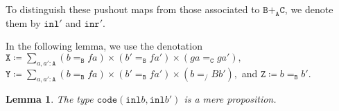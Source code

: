 \message{ !name(notes.tex)}\documentclass[12pt]{amsart}
\newcommand{\bydef}{\coloneqq}
\newcommand{\type}[1]{\mathtt{#1}}
\newcommand{\A}{\type{A}}
\newcommand{\B}{\type{B}}
\newcommand{\C}{\type{C}}
\newcommand{\BAC}{\B +_{\A} \C}
\newcommand{\inl}{\type{inl}}
\newcommand{\inr}{\type{inr}}
\newcommand{\code}{\type{code}}
\newtheorem{lemma}{Lemma}
\theoremstyle{remark}
\theoremstyle{definition}
\begin{document}
To distinguish these pushout maps from those associated to \( \BAC \),
we denote them by \( \inl' \) and \( \inr' \).
\par

In the following lemma, we use the denotation
\(
    \type{X} \bydef
    \sum_{ a , a' : \A }
    ( b =_\B fa ) \times ( b' =_\B fa') \times ( ga =_\C ga' ),
\)
%
\(
    \type{Y} \bydef
    \sum_{ a , a' : \A }
    ( b =_\B fa ) \times ( b' =_\B fa' ) \times ( b =_/B b' ),
\)
%
and
%
\(
    \type{Z} \bydef b =_\B b'.
\)
\par


\begin{lemma} \label{thm:code-bb-isProp}
%
  The type
  \(
      \code ( \inl b , \inl b' )
  \)
  is a mere proposition.
%  
\end{lemma}
\end{document}

